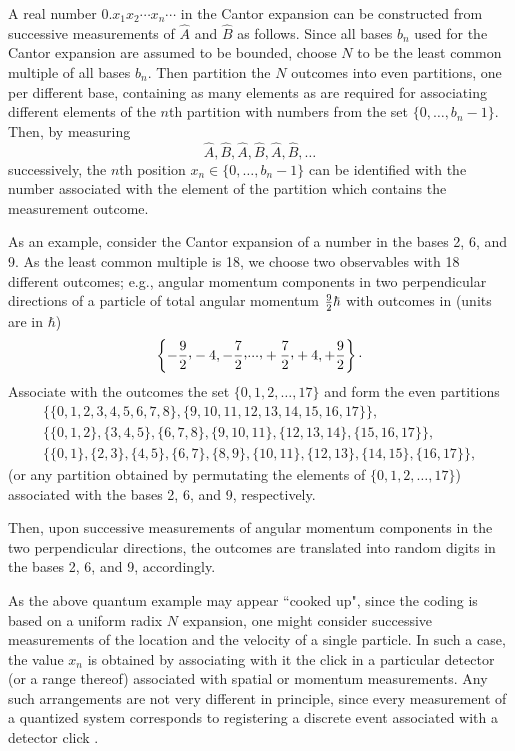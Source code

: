 \documentclass[11pt,a4paper,twoside]{article}
\begin{document}
A real number $0.x_1x_2\cdots x_n \cdots $ in the Cantor expansion
can be constructed from successive  measurements of $\hat{A}$
and $\hat{B}$ as follows.
Since all bases $b_n$ used for the Cantor
expansion are assumed to be bounded, choose $N$ to be
the least common multiple of all bases $b_n$.
Then partition the $N$ outcomes into even partitions,
one per different base,
containing as many elements as are required for
associating different elements of the $n$th partition
with  numbers from the set  $\{0,\ldots ,b_n-1\}$.
Then, by measuring 
$$\hat{A},\hat{B},\hat{A},\hat{B},\hat{A},\hat{B},\ldots$$
successively, the $n$th position  $x_n \in \{0,\ldots ,b_n-1\}$
can be identified
with the number associated with the element of the partition which
contains the measurement outcome.

As an example, consider the Cantor expansion of a number in the bases
 2, 6, and 9. As the  least common multiple is 18, we choose two
observables with 18 different outcomes; e.g., angular momentum
components in two perpendicular directions of a particle of total
angular
momentum  ${9\over 2} \hbar$ with outcomes in  (units are in $\hbar$)
$$\left\{ -{9\over 2} \raisebox{.4ex}{,}-4,-{7\over 2}
\raisebox{.4ex}{,}
\raisebox{.4ex}{.}\raisebox{.4ex}{.}\raisebox{.4ex}{.,} +{7\over 2} \raisebox{.4ex}{,} +4,+{9\over
2}\right\} \raisebox{.4ex}{.}$$
Associate with the outcomes the set
$\{0,1,2,\ldots ,17\}$
and form the even partitions
\begin{eqnarray}
&\{\{0,1,2,3,4,5,6,7,8\},\{9,10,11,12,13,14,15,16,17\}\},&\nonumber  \\
&\{\{0,1,2\},\{3,4,5\},\{6,7,8\},\{9,10,11\},\{12,13,14\},\{15,16,17\}\},&\nonumber  \\
&\{\{0,1\},\{2,3\},\{4,5\},\{6,7\},\{8,9\},\{10,11\},\{12,13\},\{14,15\},\{1
6,17\}\},&\nonumber
\end{eqnarray}
(or any partition obtained by permutating the elements of $\{0,1,2,\ldots
,17\}$)
associated with the bases  2, 6, and 9, respectively.

Then, upon successive measurements of angular momentum
components in the two perpendicular directions,
the outcomes  are translated into random digits in the bases  2, 6, and 9, 
accordingly.


As the above quantum example may appear   ``cooked up",  since  the
coding is based on a uniform radix $N$ expansion, one
might consider successive measurements of the location and the velocity of
a single particle. In such a case, the value $x_n$ is obtained by
associating with it
the click in a particular detector (or a range thereof) associated with
spatial or momentum measurements. Any such arrangements are not very
different in principle, since every measurement of a quantized system
corresponds to registering a discrete event associated with a detector
click \cite{sum-4}.
\end{document}
